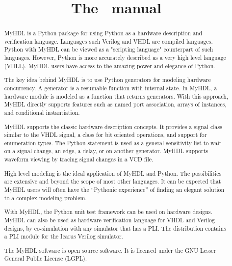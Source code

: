 \documentclass{manual}
\title{The \myhdl\ manual}
\newcommand{\myhdl}{\protect \mbox{MyHDL}}
\begin{document}
\maketitle



\begin{abstract}

\noindent

\myhdl{} is a Python package for using Python as a hardware description
and verification language. Languages such Verilog and VHDL are
compiled languages. Python with \myhdl{} can be viewed as a "scripting
language" counterpart of such languages. However, Python is more
accurately described as a very high level language (VHLL). \myhdl{} users
have access to the amazing power and elegance of Python.


The key idea behind \myhdl{} is to use Python generators for modeling
hardware concurrency. A generator is a resumable function with
internal state. In \myhdl{}, a hardware module is modeled as a function
that returns generators. With this approach, \myhdl{} directly supports
features such as named port association, arrays of instances, and
conditional instantiation. 


\myhdl{} supports the classic hardware description concepts.  It provides
a signal class similar to the VHDL signal, a class for bit oriented
operations, and support for enumeration types.  The Python
 statement is used as a general sensitivity list to
wait on a signal change, an edge, a delay, or on another
generator. \myhdl{} supports waveform viewing by tracing signal changes
in a VCD file.


High level modeling is the ideal application of \myhdl{} and Python.
The possibilities are extensive and beyond the scope of most other
languages. It can be expected that \myhdl{} users will often have the
``Pythonic experience'' of finding an elegant solution to a complex
modeling problem.


With \myhdl{}, the Python unit test framework can be used on hardware
designs.  \myhdl{} can also be used as hardware verification language for
VHDL and Verilog designs, by co-simulation with any simulator that has
a PLI.  The distribution contains a PLI module for the
Icarus Verilog simulator.


The \myhdl{} software is open source software. It is licensed under the
GNU Lesser General Public License (LGPL).




\end{abstract}

\tableofcontents









\end{document}
